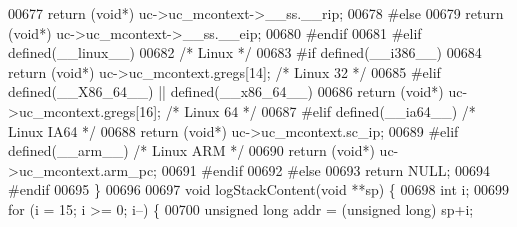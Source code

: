 \begin{DoxyCode}
{{{{{{{{{{{{{{{{{{{{{{{{{{{{{{{{{{{{{{{{{{00677     \textcolor{keywordflow}{return} (\textcolor{keywordtype}{void}*) uc->uc\_mcontext->\_\_ss.\_\_rip;
00678     \textcolor{preprocessor}{#}\textcolor{preprocessor}{else}
00679     \textcolor{keywordflow}{return} (\textcolor{keywordtype}{void}*) uc->uc\_mcontext->\_\_ss.\_\_eip;
00680     \textcolor{preprocessor}{#}\textcolor{preprocessor}{endif}
00681 \textcolor{preprocessor}{#}\textcolor{preprocessor}{elif} \textcolor{preprocessor}{defined}\textcolor{preprocessor}{(}\_\_linux\_\_\textcolor{preprocessor}{)}
00682     \textcolor{comment}{/* Linux */}
00683     \textcolor{preprocessor}{#}\textcolor{preprocessor}{if} \textcolor{preprocessor}{defined}\textcolor{preprocessor}{(}\textcolor{preprocessor}{\_\_i386\_\_}\textcolor{preprocessor}{)}
00684     \textcolor{keywordflow}{return} (\textcolor{keywordtype}{void}*) uc->uc\_mcontext.gregs[14]; \textcolor{comment}{/* Linux 32 */}
00685     \textcolor{preprocessor}{#}\textcolor{preprocessor}{elif} \textcolor{preprocessor}{defined}\textcolor{preprocessor}{(}\textcolor{preprocessor}{\_\_X86\_64\_\_}\textcolor{preprocessor}{)} \textcolor{preprocessor}{||} \textcolor{preprocessor}{defined}\textcolor{preprocessor}{(}\_\_x86\_64\_\_\textcolor{preprocessor}{)}
00686     \textcolor{keywordflow}{return} (\textcolor{keywordtype}{void}*) uc->uc\_mcontext.gregs[16]; \textcolor{comment}{/* Linux 64 */}
00687     \textcolor{preprocessor}{#}\textcolor{preprocessor}{elif} \textcolor{preprocessor}{defined}\textcolor{preprocessor}{(}\textcolor{preprocessor}{\_\_ia64\_\_}\textcolor{preprocessor}{)} \textcolor{comment}{/* Linux IA64 */}
00688     \textcolor{keywordflow}{return} (\textcolor{keywordtype}{void}*) uc->uc\_mcontext.sc\_ip;
00689     \textcolor{preprocessor}{#}\textcolor{preprocessor}{elif} \textcolor{preprocessor}{defined}\textcolor{preprocessor}{(}\textcolor{preprocessor}{\_\_arm\_\_}\textcolor{preprocessor}{)} \textcolor{comment}{/* Linux ARM */}
00690     \textcolor{keywordflow}{return} (\textcolor{keywordtype}{void}*) uc->uc\_mcontext.arm\_pc;
00691     \textcolor{preprocessor}{#}\textcolor{preprocessor}{endif}
00692 \textcolor{preprocessor}{#}\textcolor{preprocessor}{else}
00693     \textcolor{keywordflow}{return} NULL;
00694 \textcolor{preprocessor}{#}\textcolor{preprocessor}{endif}
00695 \}
00696 
00697 \textcolor{keywordtype}{void} logStackContent(\textcolor{keywordtype}{void} **sp) \{
00698     \textcolor{keywordtype}{int} i;
00699     \textcolor{keywordflow}{for} (i = 15; i >= 0; i--) \{
00700         \textcolor{keywordtype}{unsigned} \textcolor{keywordtype}{long} addr = (\textcolor{keywordtype}{unsigned} \textcolor{keywordtype}{long}) sp+i;
}}}}}}}}}}}}}}}}}}}}}}}}}}}}}}}}}}}}}}}}}}
\end{DoxyCode}
